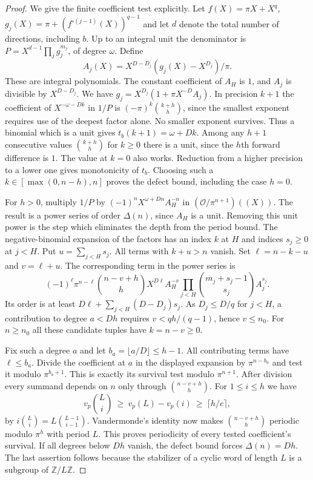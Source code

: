 \begin{proof}
We give the finite coefficient test explicitly.
Let $f(X)=\pi X+X^q$, $g_j(X)=\pi+(f^{\circ(j-1)}(X))^{q-1}$ and
let $d$ denote the total number of directions, including $b$.
Up to an integral unit the denominator is
$P=X^{d-1}\prod_jg_j^{m_j}$, of degree $\omega$.
Define
\[
 A_j(X)=X^{D-D_j}(g_j(X)-X^{D_j})/\pi.
\]
These are integral polynomials. The constant coefficient of $A_H$ is $1$,
and $A_j$ is divisible by $X^{D-D_j}$.
We have $g_j=X^{D_j}(1+\pi X^{-D}A_j)$.
In precision $k+1$ the coefficient of $X^{-\omega-Dk}$ in $1/P$
is $(-\pi)^k\binom{k+h}{h}$, since the smallest exponent requires use of the
deepest factor alone. No smaller exponent survives. Thus a binomial
which is a unit gives $t_b(k+1)=\omega+Dk$.
Among any $h+1$ consecutive values $\binom{k+h}{h}$ for $k\ge0$ there is
a unit, since the $h$th forward difference is $1$. The value at $k=0$
also works. Reduction from a higher precision to a lower one gives monotonicity
of $t_b$. Choosing such a $k\in[\max(0,n-h),n]$ proves the defect bound,
including the case $h=0$.

For $h>0$, multiply $1/P$ by $(-1)^n X^{\omega+Dn}A_H^{-n}$ in
$(\mathcal O/\pi^{n+1})((X))$. The result is a power series of order
$\Delta(n)$, since $A_H$ is a unit. Removing this unit power is the step
which eliminates the depth from the period bound.
The negative-binomial expansion of the factors has an index $k$ at $H$
and indices $s_j\ge0$ at $j<H$. Put $u=\sum_{j<H}s_j$.
All terms with $k+u>n$ vanish. Set $\ell=n-k-u$ and $v=\ell+u$.
The corresponding term in the power series is
\[
 (-1)^\ell\pi^{n-\ell}\binom{n-v+h}{h}X^{D\ell}A_H^{-v}
          \prod_{j<H}\binom{m_j+s_j-1}{s_j} A_j^{s_j}.
\]
Its order is at least $D\ell+\sum_{j<H}(D-D_j)s_j$.
As $D_j\le D/q$ for $j<H$, a contribution to degree $a<Dh$
requires $v<qh/(q-1)$, hence $v\le n_0$. For $n\ge n_0$ all
these candidate tuples have $k=n-v\ge0$.

Fix such a degree $a$ and let $b_a=\lfloor a/D\rfloor\le h-1$.
All contributing terms have $\ell\le b_a$. Divide the coefficient
at $a$ in the displayed expansion by $\pi^{n-b_a}$ and test it
modulo $\pi^{b_a+1}$. This is exactly its survival test modulo $\pi^{n+1}$.
After division every summand depends on $n$ only through
$\binom{n-v+h}{h}$.
For $1\le i\le h$ we have
\[
 v_p\binom{L}{i}\ \ge\ v_p(L)-v_p(i)\ \ge\ \lceil h/e\rceil,
\]
by $i\binom{L}{i}=L\binom{L-1}{i-1}$. Vandermonde's identity now
makes $\binom{n-v+h}{h}$ periodic modulo $\pi^h$ with period $L$.
This proves periodicity of every tested coefficient's survival. If all
degrees below $Dh$ vanish, the defect bound forces $\Delta(n)=Dh$.
The last assertion follows because the stabilizer of a cyclic word of
length $L$ is a subgroup of $\mathbb Z/L\mathbb Z$.
\end{proof}

